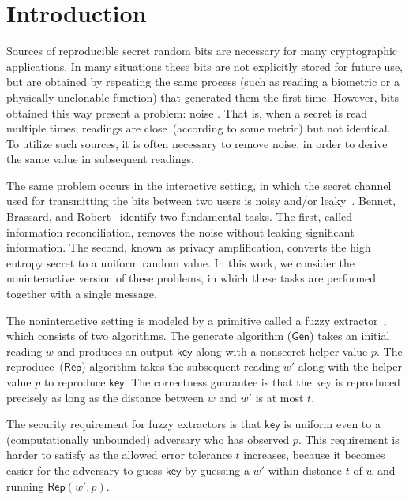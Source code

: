 \documentclass[11pt]{article}
\newcommand{\class}[1]{{\ensuremath{\mathsf{#1}}}}
\newcommand{\key}{\ensuremath{\class{key}}\xspace}
\newcommand{\gen}{\ensuremath{\class{Gen}}\xspace}
\newcommand{\rep}{\ensuremath{\class{Rep}}\xspace}
\begin{document}
\newpage
\tableofcontents\newpage

\section{Introduction}
Sources of reproducible secret random bits are necessary for many cryptographic applications.  In many situations these bits are not explicitly stored for future use, but are obtained by repeating the same process  (such as reading a biometric or a physically unclonable function) that generated them the first time.
However, bits obtained this way present a problem: noise \cite{daugman2004,zviran1993comparison,brostoff2000passfaces,ellison2000protecting,mayrhofer2009shake,monrose2002password,pappu2002physical,tuyls2006puf,gassend2002silicon,suh2007physical,bennett1988privacy}.  That is, when a secret is read multiple times, readings are close~(according to some metric) but not identical.  To utilize such sources, it is often necessary to remove noise, in order to derive the same value in subsequent readings.

The same problem occurs in the interactive setting, in which the secret channel used for transmitting the bits between two users is noisy and/or leaky~\cite{wyner1975wire}. Bennet, Brassard, and Robert~\cite{bennett1988privacy} identify two fundamental tasks.  The first, called information reconciliation, removes the noise without leaking significant information. The second, known as privacy amplification, converts the high entropy secret to a uniform random value.  In this work, we consider the noninteractive version of these problems, in which these tasks are performed together with a single message.

The noninteractive setting is modeled by a primitive called a fuzzy extractor~\cite{DBLP:journals/siamcomp/DodisORS08}, which consists of two algorithms.  %
The  generate algorithm ($\gen$)  takes an initial reading $w$ and produces an output $\key$ along with a nonsecret helper value $p$.  The reproduce~($\rep$) algorithm takes the subsequent reading $w'$ along with the helper value $p$ to reproduce $\key$.   The correctness guarantee is that the key is reproduced precisely as long as the distance between $w$ and $w'$ is at most $t$. 

The security requirement for fuzzy extractors is that $\key$ is uniform even to a (computationally unbounded) adversary who has observed $p$.   This requirement is  harder to satisfy as the allowed error tolerance $t$ increases, because it becomes easier for the adversary to guess $\key$ by guessing a $w'$ within distance $t$ of $w$ and running $\rep(w',p)$.
\end{document}
